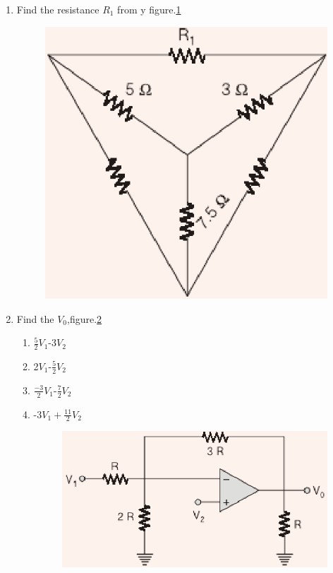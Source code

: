 \documentclass[journal,12pt,twocolumn]{IEEEtran}
\begin{document}
\begin{enumerate}
\item Find the resistance $R_{1}$ from y figure.\ref{fig94}
\begin{figure}[!h]
\begin{center}
\includegraphics[scale=0.7]{./figs/fig94.eps}
\caption{}
\label{fig94}
\end{center}
\end{figure}

\item Find the $ V_{0} $,figure.\ref{fig95}\\
\begin{enumerate}
\setlength\itemsep{2em}
\item $\frac{5}{2}V_{1}$-3$V_{2}$
\item 2$V_{1}$-$\frac{5}{2}V_{2}$
\item $\frac{-3}{2}V_{1}$-$\frac{7}{2}V_{2}$
\item -3$V_{1}+\frac{11}{2}V_{2}$
\begin{figure}[!h]
\begin{center}
\includegraphics[scale=0.7]{./figs/fig95.eps}
\caption{}
\label{fig95}
\end{center}
\end{figure}
\end{enumerate}


\end{enumerate}
\end{document}
